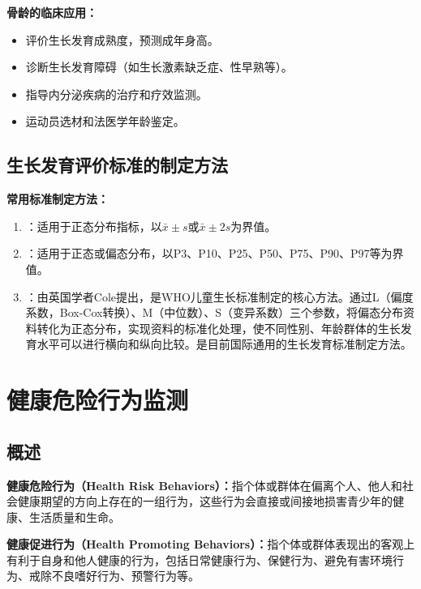 \begin{keybox}
\textbf{骨龄的临床应用：}
\begin{itemize}[leftmargin=*]
    \item 评价生长发育成熟度，预测成年身高。
    \item 诊断生长发育障碍（如生长激素缺乏症、性早熟等）。
    \item 指导内分泌疾病的治疗和疗效监测。
    \item 运动员选材和法医学年龄鉴定。
\end{itemize}
\end{keybox}

\subsection{生长发育评价标准的制定方法}

\begin{defbox}
\textbf{常用标准制定方法：}

\begin{enumerate}[leftmargin=*]
    \item {}：适用于正态分布指标，以$\bar{x}\pm s$或$\bar{x}\pm 2s$为界值。

    \item {}：适用于正态或偏态分布，以P3、P10、P25、P50、P75、P90、P97等为界值。

    \item {}：由英国学者Cole提出，是WHO儿童生长标准制定的核心方法。通过L（偏度系数，Box-Cox转换）、M（中位数）、S（变异系数）三个参数，将偏态分布资料转化为正态分布，实现资料的标准化处理，使不同性别、年龄群体的生长发育水平可以进行横向和纵向比较。是目前国际通用的生长发育标准制定方法。
\end{enumerate}
\end{defbox}

\section{健康危险行为监测}

\subsection{概述}

\begin{defbox}
\textbf{健康危险行为（Health Risk Behaviors）：}指个体或群体在偏离个人、他人和社会健康期望的方向上存在的一组行为，这些行为会直接或间接地损害青少年的健康、生活质量和生命。

\textbf{健康促进行为（Health Promoting Behaviors）：}指个体或群体表现出的客观上有利于自身和他人健康的行为，包括日常健康行为、保健行为、避免有害环境行为、戒除不良嗜好行为、预警行为等。
\end{defbox}


